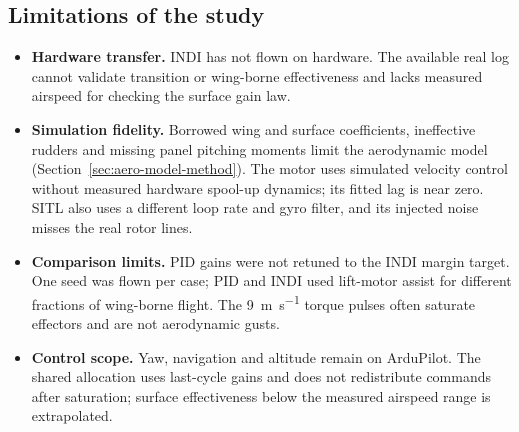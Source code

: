 \documentclass{article}
\begin{document}
\subsection{Limitations of the study}
\label{sec:limitations}
\begin{itemize}
    \item \textbf{Hardware transfer.} INDI has not flown on hardware. The available real log cannot validate transition or wing-borne effectiveness and lacks measured airspeed for checking the surface gain law.
    \item \textbf{Simulation fidelity.} Borrowed wing and surface coefficients, ineffective rudders and missing panel pitching moments limit the aerodynamic model (Section~\ref{sec:aero-model-method}). The motor uses simulated velocity control without measured hardware spool-up dynamics; its fitted lag is near zero. SITL also uses a different loop rate and gyro filter, and its injected noise misses the real rotor lines.
    \item \textbf{Comparison limits.} PID gains were not retuned to the INDI margin target. One seed was flown per case; PID and INDI used lift-motor assist for different fractions of wing-borne flight. The \SI{9}{\meter\per\second} torque pulses often saturate effectors and are not aerodynamic gusts.
    \item \textbf{Control scope.} Yaw, navigation and altitude remain on ArduPilot. The shared allocation uses last-cycle gains and does not redistribute commands after saturation; surface effectiveness below the measured airspeed range is extrapolated.
\end{itemize}
\end{document}
